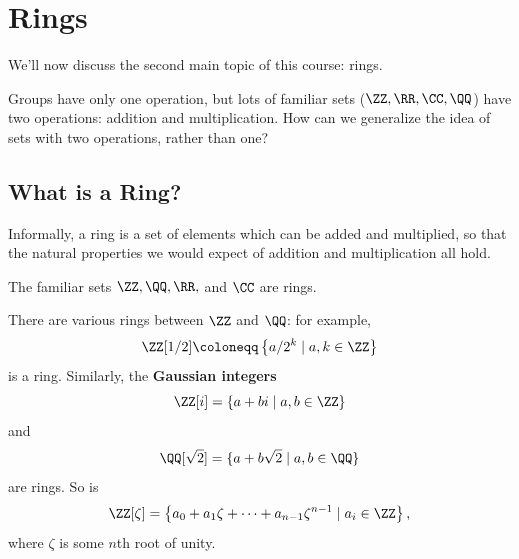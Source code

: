 


\section{Rings}

We'll now discuss the second main topic of this course: rings.

\begin{qq}
Groups have only one operation, but lots of familiar sets ($\ZZ, \RR, \CC, \QQ$) have two operations: addition and multiplication. How can we generalize the idea of sets with two operations, rather than one?
\end{qq}

\subsection{What is a Ring?}

Informally, a ring is a set of elements which can be added and multiplied, so that the natural properties we would expect of addition and multiplication all hold. 

\begin{example}
The familiar sets $\ZZ, \QQ, \RR,$ and $\CC$ are rings. 
\end{example}

\begin{example}
There are various rings between $\ZZ$ and $\QQ$: for example, \[\ZZ[1/2] \coloneqq \left\{a/2^k \mid a, k \in \ZZ\right\}\] is a ring. Similarly, the \textbf{Gaussian integers} \[\ZZ[i] = \{a + bi \mid a, b \in \ZZ\}\] and \[\QQ[\sqrt{2}] = \{a + b\sqrt{2} \mid a, b \in \QQ\}\] are rings. So is \[\ZZ[\zeta] = \left\{a_0 + a_1\zeta + \cdots + a_{n - 1}\zeta^{n - 1} \mid a_i \in \ZZ\right\},\] where $\zeta$ is some $n$th root of unity. 
\end{example}


